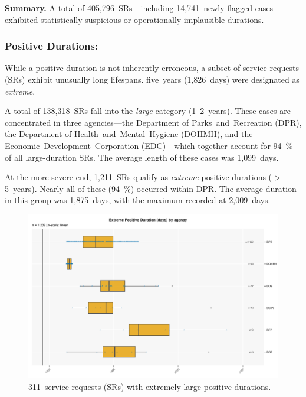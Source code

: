 \documentclass[linenumber]{jdsart}
\begin{document}
\textbf{Summary.}  
A total of 405{,}796~\textsc{SR}s—including 
14{,}741~newly flagged cases—exhibited statistically suspicious or 
operationally implausible durations.

\subsubsection{Positive Durations:}
\label{subsubsec:positivedurations}
While a positive duration is not inherently erroneous, a subset of 
service requests (\textsc{SR}s) exhibit unusually long lifespans. 
five~years (1{,}826~days) were designated as \emph{extreme}.  

A total of 138{,}318~\textsc{SR}s fall into the \emph{large} category (1--2~years). 
These cases are concentrated in three agencies—the Department of 
Parks~and~Recreation (\textsc{DPR}), the Department of 
Health~and~Mental~Hygiene (\textsc{DOHMH}), and the 
Economic~Development~Corporation (\textsc{EDC})—which together account for 
\SI{94}{\percent} of all large-duration \textsc{SR}s. 
The average length of these cases was 1{,}099~days.  

At the more severe end, 1{,}211~\textsc{SR}s qualify as 
\emph{extreme} positive durations ($>$\,5~years). 
Nearly all of these (\SI{94}{\percent}) occurred within \textsc{DPR}. 
The average duration in this group was 1{,}875~days, 
with the maximum recorded at 2{,}009~days.  

\begin{figure}[tbp]
    \centering
    \includegraphics[width=\textwidth, height=0.33\textheight, keepaspectratio]{boxplot_extreme_positive_days_by_agency.pdf}
    \caption{311~service requests (\textsc{SR}s) with extremely large 
    positive durations.}
    \label{fig:extremepositive}
\end{figure}
\end{document}
